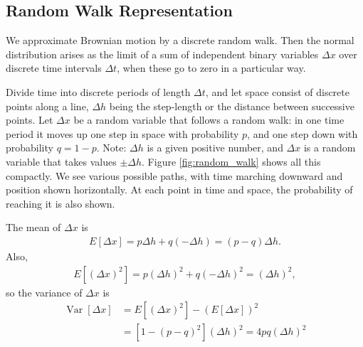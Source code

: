 \documentclass[\topdir/lecture\_notes.tex]{subfiles}
\begin{document}
\subsection{Random Walk Representation}
We approximate Brownian motion by a discrete random walk. Then the normal distribution arises as the limit of a sum
of independent binary variables $\Delta x$ over discrete time intervals $\Delta t$, when these go to zero in a particular way.

Divide time into discrete periods of length $\Delta t$, and let space consist of discrete points along a line, $\Delta h$ being the step-length or the distance between successive points. Let $\Delta x$ be a random variable that follows a random walk: in one time period it moves up one step in space with probability $p$, and one step down with probability $q=1-p$. Note: $\Delta h$ is a given positive number, and $\Delta x$ is a random variable that takes values $\pm \Delta h$. Figure \ref{fig:random_walk} shows all this compactly. We see various possible paths, with time marching downward and position shown horizontally. At each point in time and space, the probability of reaching it is also shown.

The mean of $\Delta x$ is
\begin{align}
    E[\Delta x]=p \Delta h+q(-\Delta h)=(p-q) \Delta h.
\end{align}
Also,
\begin{align*}
    E\left[(\Delta x)^{2}\right]=p(\Delta h)^{2}+q(-\Delta h)^{2}=(\Delta h)^{2},
\end{align*}
so the variance of $\Delta x$ is
\begin{align}
    \operatorname{Var}[\Delta x] & =E\left[(\Delta x)^{2}\right]-(E[\Delta x])^{2} \\
    & =\left[1-(p-q)^{2}\right](\Delta h)^{2}=4 p q(\Delta h)^{2}
\end{align}
\end{document}
